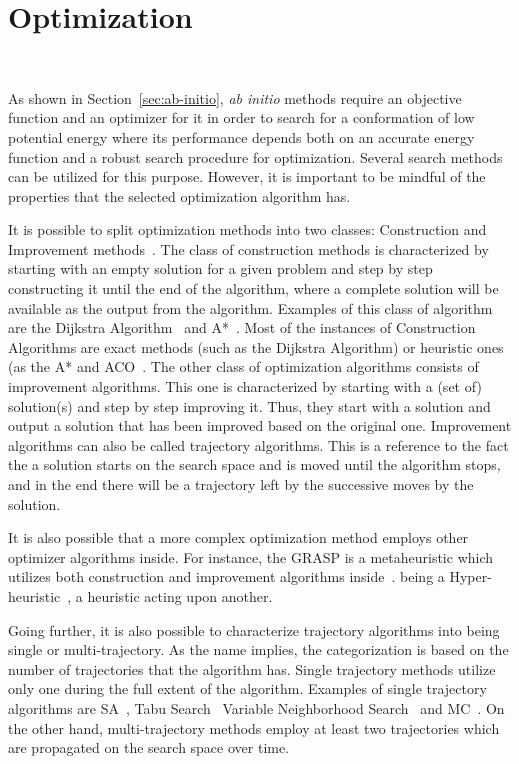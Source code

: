 \section{Optimization}~\label{sec:bioinspired}

As shown in Section~\ref{sec:ab-initio}, \textit{ab initio} methods require an
objective function and an optimizer for it in order to search for a
conformation of low potential energy where its performance depends both on an
accurate energy function and a robust search procedure for optimization.
Several search methods can be utilized for this purpose. However, it is
important to be mindful of the properties that the selected optimization
algorithm has.

It is possible to split optimization methods into two classes: Construction and
Improvement methods~\cite{russell2016artificial}. The class of construction
methods is characterized by starting with an empty solution for a given problem
and step by step constructing it until the end of the algorithm, where a
complete solution will be available as the output from the algorithm. Examples
of this class of algorithm are the Dijkstra
Algorithm~\cite{dijkstra1959dijkstra} and A*~\cite{hart1968formal}. Most of the
instances of Construction Algorithms are exact methods (such as the Dijkstra
Algorithm) or heuristic ones (as the A* and \ac{ACO}~\cite{dorigo1999ant}.  The
other class of optimization algorithms consists of improvement algorithms. This
one is characterized by starting with a (set of) solution(s) and step by step
improving it. Thus, they start with a solution and output a solution that has
been improved based on the original one. Improvement algorithms can also be
called trajectory algorithms. This is a reference to the fact the a solution
starts on the search space and is moved until the algorithm stops, and in the
end there will be a trajectory left by the successive moves by the solution.

It is also possible that a more complex optimization method employs other
optimizer algorithms inside. For instance, the \ac{GRASP} is a metaheuristic
which utilizes both construction and improvement algorithms
inside~\cite{feo1995greedy}. %
being a Hyper-heuristic~\cite{burke2003hyper}, a heuristic acting upon another.

Going further, it is also possible to characterize trajectory algorithms into
being single or multi-trajectory. As the name implies, the categorization is
based on the number of trajectories that the algorithm has. Single trajectory
methods utilize only one during the full extent of the algorithm. Examples of
single trajectory algorithms are \ac{SA}~\cite{kirkpatrick1983optimization},
Tabu Search~\cite{glover1998tabu} Variable Neighborhood
Search~\cite{mladenovic1997variable} and \ac{MC}~\cite{hastings1970monte}. On
the other hand, multi-trajectory methods employ at least two trajectories which
are propagated on the search space over time.

